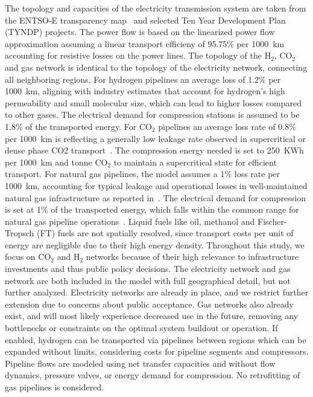 \documentclass[twocolumn]{article}
\newcommand{\carbon}{CO$_2$}
\newcommand{\hydrogen}{H$_2$}
\begin{document}
The topology and capacities of the electricity transmission system are taken from the ENTSO-E transparency map~\cite{wiegmansGridkitExtractEntsoE2016} and selected Ten Year Development Plan (TYNDP) projects. The power flow is based on the linearized power flow approximation assuming a linear transport efficieny of 95.75\% per 1000~km accounting for resistive losses on the power lines. %
The topology of the \hydrogen{}, \carbon{} and gas network is identical to the topology of the electricity network, connecting all neighboring regions.
For hydrogen pipelines an average loss of 1.2\% per 1000~km, aligning with industry estimates that account for hydrogen's high permeability and small molecular size, which can lead to higher losses compared to other gases. The electrical demand for compression stations is assumed to be 1.8\% of the transported energy.
For \carbon{} pipelines an average loss rate of 0.8\% per 1000~km is reflecting a generally low leakage rate observed in supercritical or dense phase CO2 transport~\cite{liuExperimentalStudyLeakage2023,vitaliRisksSafetyCO22021}. The compression energy needed is set to 250~KWh per 1000~km and tonne \carbon{} to maintain a supercritical state for efficient transport. For natural gas pipelines, the model assumes a 1\% loss rate per 1000~km, accounting for typical leakage and operational losses in well-maintained natural gas infrastructure as reported in~\cite{NaturalGasTransmission2021}. The electrical demand for compression is set at 1\% of the transported energy, which falls within the common range for natural gas pipeline operations~\cite{mcvayreneeMethaneEmissionsGas2023}.
%
Liquid fuels like oil, methanol and Fischer-Tropsch (FT) fuels are not spatially resolved, since transport costs per unit of energy are negligible due to their high energy density. Throughout this study, we focus on \carbon{} and \hydrogen{} networks because of their high relevance to infrastructure investments and thus public policy decisions. The electricity network and gas network are both included in the model with full geographical detail, but not further analyzed. Electricity networks are already in place, and we restrict further extension due to concerns about public acceptance. Gas networks also already exist, and will most likely experience decreased use in the future, removing any bottlenecks or constraints on the optimal system buildout or operation.
If enabled, hydrogen can be transported via pipelines between regions which can be expanded without limits, considering costs for pipeline segments and compressors. Pipeline flows are modeled using net transfer capacities and without flow dynamics, pressure valves, or energy demand for compression. No retrofitting of gas pipelines is considered.
\end{document}
